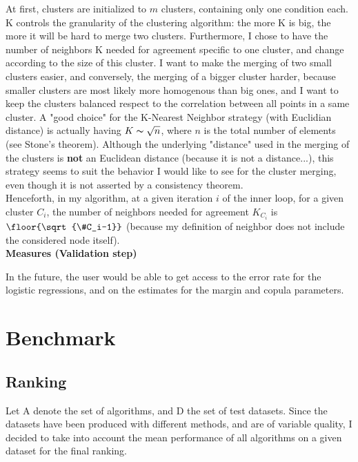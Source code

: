 \documentclass{report}
\begin{document}
{At first, clusters are initialized to $m$ clusters, containing only one condition each.\\

K controls the granularity of the clustering algorithm: the more K is big, the more it will be hard to merge two clusters. Furthermore, I chose to have the number of neighbors K needed for agreement specific to one cluster, and change according to the size of this cluster. I want to make the merging of two small clusters easier, and conversely, the merging of a bigger cluster harder, because smaller clusters are most likely more homogenous than big ones, and I want to keep the clusters balanced respect to the correlation between all points in a same cluster. A "good choice" for the K-Nearest Neighbor strategy (with Euclidian distance) is actually having $K \thicksim \sqrt{n}$, where $n$ is the total number of elements (see Stone's theorem\cite{stone1977consistent}). Although the underlying "distance" used in the merging of the clusters is \textbf{not} an Euclidean distance (because it is not a distance...), this strategy seems to suit the behavior I would like to see for the cluster merging, even though it is not asserted by a consistency theorem.\\

Henceforth, in my algorithm, at a given iteration $i$ of the inner loop, for a given cluster $C_i$, the number of neighbors needed for agreement $K_{C_i}$ is $\floor{\sqrt{\#C_i-1}}$ (because my definition of neighbor does not include the considered node itself).\\

\bigskip
\noindent \textbf{Measures (Validation step)}
\bigskip

In the future, the user would be able to get access to the error rate for the logistic regressions, and on the estimates for the margin and copula parameters.

\chapter{Benchmark}

\section*{Ranking}

Let A denote the set of algorithms, and D the set of test datasets. Since the datasets have been produced with different methods, and are of variable quality, I decided to take into account the mean performance of all algorithms on a given dataset for the final ranking.\\

}
\end{document}
